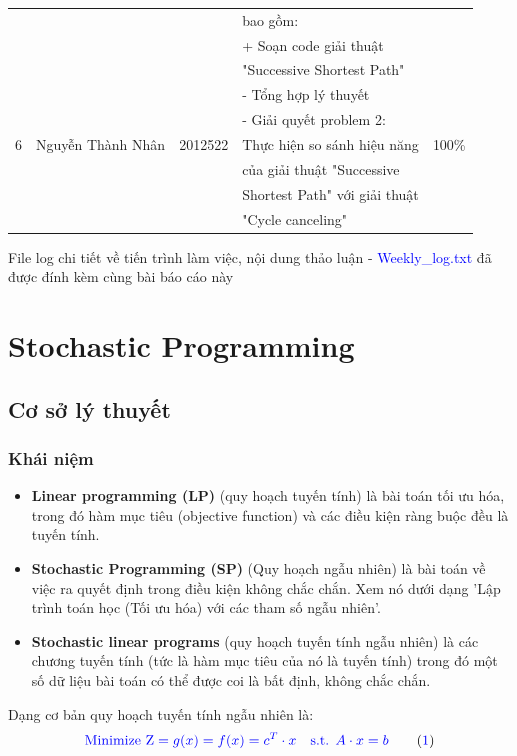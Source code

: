 \documentclass[a4paper]{article}
\begin{document}
\begin{center}
\begin{tabular}{|c|c|c|l|c|}
& &  &bao gồm:&\\
 & &  & + Soạn code giải thuật&\\
 & &  &"Successive Shortest Path"&\\
 & &  & - Tổng hợp lý thuyết&\\
\hline
\multirow{3}{*}{6} & \multirow{3}{*}{Nguyễn Thành Nhân} & \multirow{3}{*}{2012522} & - Giải quyết problem 2:& \multirow{3}{*}{100\%}\\
 & &  & Thực hiện so sánh hiệu năng&\\
 & &  & của giải thuật "Successive &\\
 & &  & Shortest Path" với giải thuật&\\
 & &  &  "Cycle canceling"&\\
\hline
\end{tabular}
\end{center}
File log chi tiết về tiến trình làm việc, nội dung thảo luận - \textcolor{blue}{Weekly\_log.txt} đã được đính kèm cùng bài báo cáo này
\section{Stochastic Programming}
	\subsection{Cơ sở lý thuyết}
 \subsubsection{Khái niệm}
\begin{itemize}
    \item \textbf{Linear programming (LP)} (quy hoạch tuyến tính) là bài toán tối ưu hóa, trong đó hàm mục tiêu (objective function) và các điều kiện ràng buộc đều là tuyến tính.
\end{itemize}
\begin{itemize}
    \item \textbf{Stochastic Programming (SP) } (Quy hoạch ngẫu nhiên) là bài toán về việc ra quyết định trong điều kiện không chắc chắn. Xem nó dưới dạng 'Lập trình toán học (Tối ưu hóa) với các tham số ngẫu nhiên'.
\end{itemize}
\begin{itemize}
    \item \textbf{Stochastic linear programs} (quy hoạch tuyến tính ngẫu nhiên) là các chương  tuyến tính (tức là hàm mục tiêu của nó là tuyến tính) trong đó một số dữ liệu bài toán có thể được coi là bất định, không chắc chắn.
\end{itemize}
Dạng cơ bản quy hoạch tuyến tính ngẫu nhiên là:
\begin{equation}
    \textcolor{blue} {\text{Minimize Z} = g(x) = f(x) = c^T\cdot x \quad \text{s.t. } A \cdot x = b} \label{eq:einstein} \tag{\textcolor{blue}{1}}
\end{equation}
\end{document}
